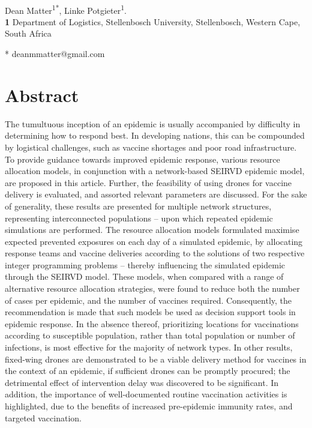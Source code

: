\documentclass[10pt,letterpaper]{article}
\begin{document}
\vspace*{0.2in}

\begin{flushleft}
{\Large
\textbf{} 
}
\newline
\\
Dean Matter\textsuperscript{1*},
Linke Potgieter\textsuperscript{1}.
\\
\bigskip
\textbf{1} Department of Logistics, Stellenbosch University, Stellenbosch, Western Cape, South Africa
\\
\bigskip

* deanmmatter@gmail.com

\end{flushleft}

\section*{Abstract}
The tumultuous inception of an epidemic is usually accompanied by difficulty in determining how to respond best. In developing nations, this can be compounded by logistical challenges, such as vaccine shortages and poor road infrastructure.
To provide guidance towards improved epidemic response, various resource allocation models, in conjunction with a network-based SEIRVD epidemic model, are proposed in this article. Further, the feasibility of using drones for vaccine delivery is evaluated, and assorted relevant parameters are discussed. For the sake of generality, these results are presented for multiple network structures, representing interconnected populations -- upon which repeated epidemic simulations are performed. The resource allocation models formulated maximise expected prevented exposures on each day of a simulated epidemic, by allocating response teams and vaccine deliveries according to the solutions of two respective integer programming problems -- thereby influencing the simulated epidemic through the SEIRVD model. These models, when compared with a range of alternative resource allocation strategies, were found to reduce both the number of cases per epidemic, and the number of vaccines required. Consequently, the recommendation is made that such models be used as decision support tools in epidemic response. In the absence thereof, prioritizing locations for vaccinations according to susceptible population, rather than total population or number of infections, is most effective for the majority of network types. 
In other results, fixed-wing drones are demonstrated to be a viable delivery method for vaccines in the context of an epidemic, if sufficient drones can be promptly procured; the detrimental effect of intervention delay was discovered to be significant. In addition, the importance of well-documented routine vaccination activities is highlighted, due to the benefits of increased pre-epidemic immunity rates, and targeted vaccination.
\end{document}
